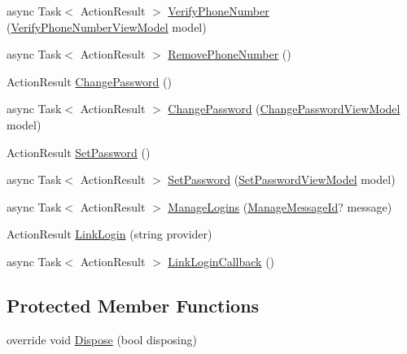 \begin{DoxyCompactItemize}
\item 
async Task$<$ Action\+Result $>$ \mbox{\hyperlink{class_brew_day2_1_1_controllers_1_1_manage_controller_a4a076b492bbec2df037c99fd3974b84e}{Verify\+Phone\+Number}} (\mbox{\hyperlink{class_brew_day2_1_1_models_1_1_verify_phone_number_view_model}{Verify\+Phone\+Number\+View\+Model}} model)
\item 
async Task$<$ Action\+Result $>$ \mbox{\hyperlink{class_brew_day2_1_1_controllers_1_1_manage_controller_a86b77bf51b859b85e32b844022177256}{Remove\+Phone\+Number}} ()
\item 
Action\+Result \mbox{\hyperlink{class_brew_day2_1_1_controllers_1_1_manage_controller_a4aebb01530f9bb9bc78baf90ba8e67c2}{Change\+Password}} ()
\item 
async Task$<$ Action\+Result $>$ \mbox{\hyperlink{class_brew_day2_1_1_controllers_1_1_manage_controller_a77e41aa6fdea6da157650b4cc6d0f101}{Change\+Password}} (\mbox{\hyperlink{class_brew_day2_1_1_models_1_1_change_password_view_model}{Change\+Password\+View\+Model}} model)
\item 
Action\+Result \mbox{\hyperlink{class_brew_day2_1_1_controllers_1_1_manage_controller_a4cd2de757b680e0487abb8dce91b3543}{Set\+Password}} ()
\item 
async Task$<$ Action\+Result $>$ \mbox{\hyperlink{class_brew_day2_1_1_controllers_1_1_manage_controller_a19aab9aee45b1acf7c4b9cbd68f79d48}{Set\+Password}} (\mbox{\hyperlink{class_brew_day2_1_1_models_1_1_set_password_view_model}{Set\+Password\+View\+Model}} model)
\item 
async Task$<$ Action\+Result $>$ \mbox{\hyperlink{class_brew_day2_1_1_controllers_1_1_manage_controller_a59a0289809aed504c5bc5163896e70a2}{Manage\+Logins}} (\mbox{\hyperlink{class_brew_day2_1_1_controllers_1_1_manage_controller_a418038dc90e9d94606f474b9c06fd8c8}{Manage\+Message\+Id}}? message)
\item 
Action\+Result \mbox{\hyperlink{class_brew_day2_1_1_controllers_1_1_manage_controller_a58d2aa9cedef8b452ffbaa421cf87391}{Link\+Login}} (string provider)
\item 
async Task$<$ Action\+Result $>$ \mbox{\hyperlink{class_brew_day2_1_1_controllers_1_1_manage_controller_aa6ce0595b7f3d5a88f3afaa189b26b05}{Link\+Login\+Callback}} ()
\end{DoxyCompactItemize}
\subsection*{Protected Member Functions}
\begin{DoxyCompactItemize}
\item 
override void \mbox{\hyperlink{class_brew_day2_1_1_controllers_1_1_manage_controller_a18d6d2893ed6e2675f33512d89997971}{Dispose}} (bool disposing)
\end{DoxyCompactItemize}
